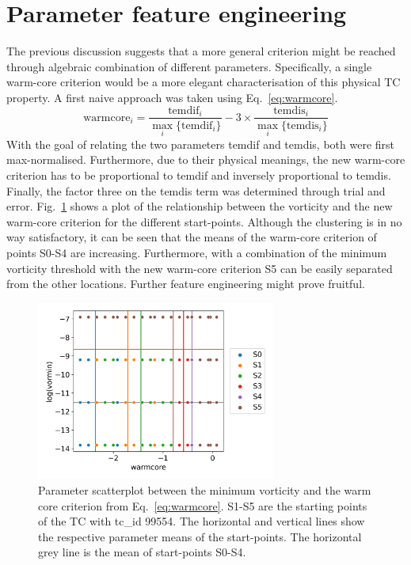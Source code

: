 \section{Parameter feature engineering}
The previous discussion suggests that a more general criterion might be reached through algebraic combination of different parameters. Specifically, a single warm-core criterion would be a more elegant characterisation of this physical TC property. A first naive approach was taken using Eq.~\ref{eq:warmcore}.
\begin{equation}
  \text{warmcore}_i = \frac{\text{temdif}_i}{\max_{i}\{ \text{temdif}_i\}} - 3 \times \frac{\text{temdis}_i}{\max_i\{ \text{temdis}_i\}}
  \label{eq:warmcore}
\end{equation}
With the goal of relating the two parameters temdif and temdis, both were first max-normalised. Furthermore, due to their physical meanings, the new warm-core criterion has to be proportional to temdif and inversely proportional to temdis. Finally, the factor three on the temdis term was determined through trial and error.
Fig.~\ref{fig:clustering} shows a plot of the relationship between the vorticity and the new warm-core criterion for the different start-points. Although the clustering is in no way satisfactory, it can be seen that the means of the warm-core criterion of points S0-S4 are increasing. Furthermore, with a combination of the minimum vorticity threshold with the new warm-core criterion S5 can be easily separated from the other locations. Further feature engineering might prove fruitful.

\begin{figure}[!htb]
	\centering
	\includegraphics[width=0.7\textwidth]{img/combined_warmcore_criterion.png}
	\caption{Parameter scatterplot between the minimum vorticity and the warm core criterion from Eq.~\ref{eq:warmcore}. S1-S5 are the starting points of the TC with tc\_id 99554. The horizontal and vertical lines show the respective parameter means of the start-points. The horizontal grey line is the mean of start-points S0-S4.}
	\label{fig:clustering}
\end{figure}

